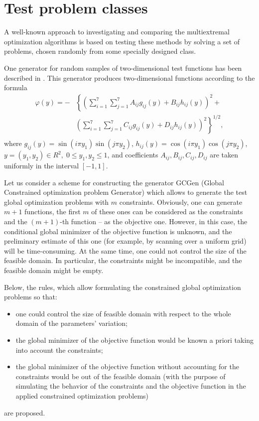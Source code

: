 \documentclass{llncs}
\begin{document}
\section{Test problem classes}
A well-known approach to investigating and comparing the multiextremal optimization algorithms is based on testing these methods by solving a set of problems, chosen randomly from some specially designed class. 

One generator for random samples of two-dimensional test functions has been described in \cite{Grishagin1978,Grishagin2016}. This generator produces two-dimensional functions according to the formula
\begin{eqnarray} \nonumber \label{VAG}
\varphi(y)= -&\left\{\left(\sum^{7}_{i=1}\sum^{7}_{j=1}A_{ij}g_{ij}(y)+B_{ij}h_{ij}(y)\right)^2+\right. \\
&\left.\left(\sum^{7}_{i=1}\sum^{7}_{j=1}C_{ij}g_{ij}(y)+D_{ij}h_{ij}(y)\right)^2\right\}^{1/2},\\ \nonumber
\end{eqnarray}
where $g_{ij}(y)=\sin(i\pi y_1)\sin(j\pi y_2)$, $h_{ij}(y)=\cos(i\pi y_1)\cos(j\pi y_2)$, $y=(y_1,y_2)\in R^2, \; 0 \leq y_1,y_2 \leq 1$, and coefficients $A_{ij}, B_{ij}, C_{ij}, D_{ij}$  are taken uniformly in the interval $[-1,1]$.

Let us consider a scheme for constructing the generator GCGen (Global Constrained optimization problem Generator) which allows to generate the test global optimization problems with $m$ constraints. Obviously, one can generate $m+1$ functions, the first $m$ of these ones can be considered as the constraints and the $(m+1)$-th function -- as the objective one. However, in this case, the conditional global minimizer of the objective function is unknown, and the preliminary estimate of this one (for example, by scanning over a uniform grid) will be time-consuming. At the same time, one could not control the size of the feasible domain. In particular, the constraints might be incompatible, and the feasible domain might be empty. 

Below, the rules, which allow formulating the constrained global optimization problems so that:
\begin{itemize}
	\item one could control the size of feasible domain with respect to the whole domain of the parameters' variation;
	\item the global minimizer of the objective function would be known a priori taking into account the constraints;
	\item the global minimizer of the objective function without accounting for the constraints would be out of the feasible domain (with the purpose of simulating the behavior of the constraints and the objective function in the applied constrained optimization problems)
\end{itemize}
are proposed. 
\end{document}
